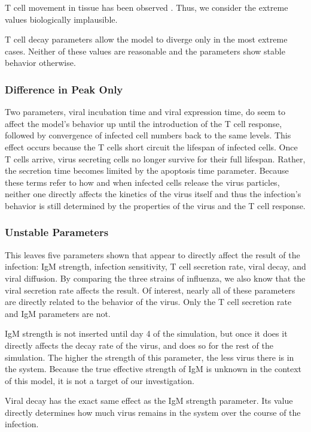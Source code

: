 \documentclass[10pt]{article}
\begin{document}
T cell movement in tissue has been observed \cite{Egen2011}.  Thus, we consider the extreme values biologically implausible.

T cell decay parameters allow the model to diverge only in the most extreme cases.  Neither of these values are reasonable and the parameters show stable behavior otherwise.

\subsubsection{Difference in Peak Only}

Two parameters, viral incubation time and viral expression time, do seem to affect the model's behavior up until the introduction of the T cell response, followed by convergence of infected cell numbers back to the same levels.  This effect occurs because the T cells short circuit the lifespan of infected cells.  Once T cells arrive, virus secreting cells no longer survive for their full lifespan.  Rather, the secretion time becomes limited by the apoptosis time parameter.  Because these terms refer to how and when infected cells release the virus particles, neither one directly affects the kinetics of the virus itself and thus the infection's behavior is still determined by the properties of the virus and the T cell response.

\subsubsection{Unstable Parameters}

This leaves five parameters shown that appear to directly affect the result of the infection: IgM strength, infection sensitivity, T cell secretion rate, viral decay, and viral diffusion.  By comparing the three strains of influenza, we also know that the viral secretion rate affects the result.  Of interest, nearly all of these parameters are directly related to the behavior of the virus.  Only the T cell secretion rate and IgM parameters are not.  

IgM strength is not inserted until day 4 of the simulation, but once it does it directly affects the decay rate of the virus, and does so for the rest of the simulation.  The higher the strength of this parameter, the less virus there is in the system.  Because the true effective strength of IgM is unknown in the context of this model, it is not a target of our investigation. 

Viral decay has the exact same effect as the IgM strength parameter.  Its value directly determines how much virus remains in the system over the course of the infection.
\end{document}
